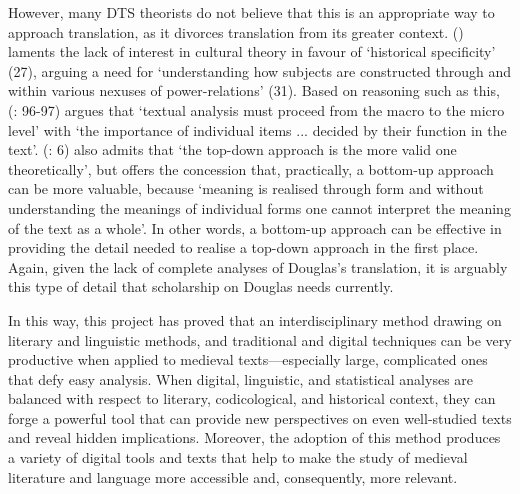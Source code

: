 \documentclass{dhbenelux}
\begin{document}
However, many DTS theorists do not believe that this is an appropriate
way to approach translation, as it divorces translation from its greater
context. \citeauthor{evans1994} (\citeyear{evans1994}) laments the lack of interest in cultural theory in
favour of `historical specificity' (27), arguing a need for
`understanding how subjects are constructed through and within various
nexuses of power-relations' (31). Based on reasoning such as this,
\citeauthor{snellhornby1987} (\citeyear{snellhornby1987}: 96-97) argues that `textual analysis must proceed
from the macro to the micro level' with `the importance of individual
items ... decided by their function in the text'. \citeauthor{baker1992} (\citeyear{baker1992}: 6)
also admits that `the top-down approach is the more valid one
theoretically', but offers the concession that, practically, a bottom-up
approach can be more valuable, because `meaning is realised through form
and without understanding the meanings of individual forms one cannot
interpret the meaning of the text as a whole'. In other words, a
bottom-up approach can be effective in providing the detail needed to
realise a top-down approach in the first place. Again, given the lack of
complete analyses of Douglas's translation, it is arguably this type of
detail that scholarship on Douglas needs currently.

In this way, this project has proved that an interdisciplinary method
drawing on literary and linguistic methods, and traditional and digital
techniques can be very productive when applied to medieval
texts---especially large, complicated ones that defy easy analysis. When
digital, linguistic, and statistical analyses are balanced with respect
to literary, codicological, and historical context, they can forge a
powerful tool that can provide new perspectives on even well-studied
texts and reveal hidden implications. Moreover, the adoption of this
method produces a variety of digital tools and texts that help to make
the study of medieval literature and language more accessible and,
consequently, more relevant.


\end{document}
